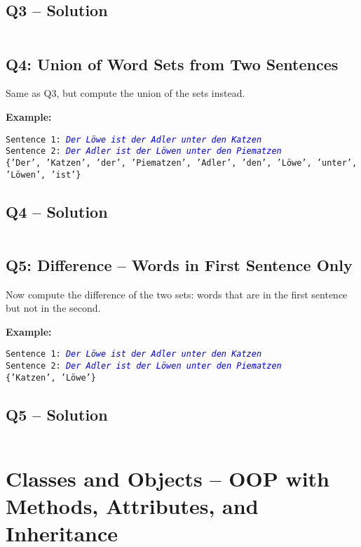 \documentclass[a4paper,11pt]{article}
\begin{document}
\subsection*{Q3 – Solution}
\inputminted{python}{Files/9/3.py}

\subsection*{Q4: Union of Word Sets from Two Sentences}
Same as Q3, but compute the union of the sets instead.

\textbf{Example:}
\begin{flushleft}
	\texttt{Sentence 1: \textcolor{blue}{\textit{Der Löwe ist der Adler unter den Katzen}}}\\
	\texttt{Sentence 2: \textcolor{blue}{\textit{Der Adler ist der Löwen unter den Piematzen}}}\\
	\texttt{\{'Der', 'Katzen', 'der', 'Piematzen', 'Adler', 'den', 'Löwe', 'unter', 'Löwen', 'ist'\}}
\end{flushleft}

\subsection*{Q4 – Solution}
\inputminted{python}{Files/9/4.py}

\subsection*{Q5: Difference – Words in First Sentence Only}
Now compute the difference of the two sets: words that are in the first sentence but not in the second.

\textbf{Example:}
\begin{flushleft}
	\texttt{Sentence 1: \textcolor{blue}{\textit{Der Löwe ist der Adler unter den Katzen}}}\\
	\texttt{Sentence 2: \textcolor{blue}{\textit{Der Adler ist der Löwen unter den Piematzen}}}\\
	\texttt{\{'Katzen', 'Löwe'\}}
\end{flushleft}

\subsection*{Q5 – Solution}
\inputminted{python}{Files/9/5.py}

\section{Classes and Objects – OOP with Methods, Attributes, and Inheritance}
\end{document}

